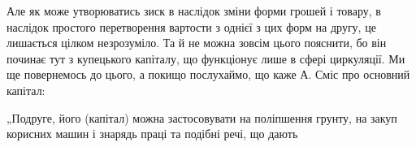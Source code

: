 Але як може утворюватись зиск в наслідок зміни форми грошей і
товару, в наслідок простого перетворення вартости з однієї з цих форм
на другу, це лишається цілком незрозуміло. Та й не можна зовсім цього
пояснити, бо він починає тут з купецького капіталу, що функціонує
лише в сфері циркуляції. Ми ще повернемось до цього, а покищо послухаймо,
що каже А. Сміс про основний капітал:

„Подруге, його (капітал) можна застосовувати на поліпшення грунту,
на закуп корисних машин і знарядь праці та подібні речі, що дають
\parbreak{}  %
